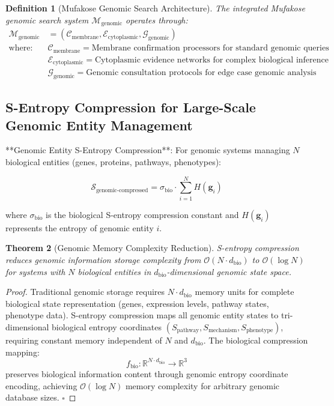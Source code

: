 \documentclass[12pt,a4paper]{article}
\newtheorem{theorem}{Theorem}[section]
\newtheorem{definition}[theorem]{Definition}
\begin{document}
\begin{definition}[Mufakose Genomic Search Architecture]
The integrated Mufakose genomic search system $\mathcal{M}_{\text{genomic}}$ operates through:
\begin{align}
\mathcal{M}_{\text{genomic}} &= (\mathcal{C}_{\text{membrane}}, \mathcal{E}_{\text{cytoplasmic}}, \mathcal{G}_{\text{genomic}}) \\
\text{where:} \quad &\mathcal{C}_{\text{membrane}} = \text{Membrane confirmation processors for standard genomic queries} \\
&\mathcal{E}_{\text{cytoplasmic}} = \text{Cytoplasmic evidence networks for complex biological inference} \\
&\mathcal{G}_{\text{genomic}} = \text{Genomic consultation protocols for edge case genomic analysis}
\end{align}
\end{definition}

\subsection{S-Entropy Compression for Large-Scale Genomic Entity Management}

**Genomic Entity S-Entropy Compression**: For genomic systems managing $N$ biological entities (genes, proteins, pathways, phenotypes):

\begin{equation}
\mathcal{S}_{\text{genomic-compressed}} = \sigma_{\text{bio}} \cdot \sum_{i=1}^{N} H(\mathbf{g}_i)
\end{equation}

where $\sigma_{\text{bio}}$ is the biological S-entropy compression constant and $H(\mathbf{g}_i)$ represents the entropy of genomic entity $i$.

\begin{theorem}[Genomic Memory Complexity Reduction]
S-entropy compression reduces genomic information storage complexity from $\mathcal{O}(N \cdot d_{\text{bio}})$ to $\mathcal{O}(\log N)$ for systems with $N$ biological entities in $d_{\text{bio}}$-dimensional genomic state space.
\end{theorem}

\begin{proof}
Traditional genomic storage requires $N \cdot d_{\text{bio}}$ memory units for complete biological state representation (genes, expression levels, pathway states, phenotype data). S-entropy compression maps all genomic entity states to tri-dimensional biological entropy coordinates $(S_{\text{pathway}}, S_{\text{mechanism}}, S_{\text{phenotype}})$, requiring constant memory independent of $N$ and $d_{\text{bio}}$. The biological compression mapping:
\begin{equation}
f_{\text{bio}}: \mathbb{R}^{N \cdot d_{\text{bio}}} \rightarrow \mathbb{R}^3
\end{equation}
preserves biological information content through genomic entropy coordinate encoding, achieving $\mathcal{O}(\log N)$ memory complexity for arbitrary genomic database sizes. $\square$
\end{proof}
\end{document}
